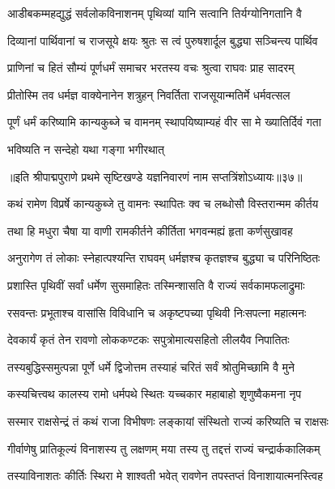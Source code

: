 \twolineshloka
{आडीबकम्महद्युद्धं सर्वलोकविनाशनम्}
{पृथिव्यां यानि सत्वानि तिर्यग्योनिगतानि वै}%

\twolineshloka
{दिव्यानां पार्थिवानां च राजसूये क्षयः श्रुतः}
{स त्वं पुरुषशार्दूल बुद्ध्या सञ्चिन्त्य पार्थिव}%

\twolineshloka
{प्राणिनां च हितं सौम्यं पूर्णधर्मं समाचर}
{भरतस्य वचः श्रुत्वा राघवः प्राह सादरम्}%

\twolineshloka
{प्रीतोस्मि तव धर्मज्ञ वाक्येनानेन शत्रुहन्}
{निवर्तिता राजसूयान्मतिर्मे धर्मवत्सल}%

\twolineshloka
{पूर्णं धर्मं करिष्यामि कान्यकुब्जे च वामनम्}
{स्थापयिष्याम्यहं वीर सा मे ख्यातिर्दिवं गता}%

\onelineshloka
{भविष्यति न सन्देहो यथा गङ्गा भगीरथात्}%

॥इति श्रीपाद्मपुराणे प्रथमे सृष्टिखण्डे यज्ञनिवारणं नाम सप्तत्रिंशोऽध्यायः॥३७॥



\twolineshloka
{कथं रामेण विप्रर्षे कान्यकुब्जे तु वामनः}
{स्थापितः क्व च लब्धोसौ विस्तरान्मम कीर्तय}%

\twolineshloka
{तथा हि मधुरा चैषा या वाणी रामकीर्तने}
{कीर्तिता भगवन्मह्यं हृता कर्णसुखावह}%

\twolineshloka
{अनुरागेण तं लोकाः स्नेहात्पश्यन्ति राघवम्}
{धर्मज्ञश्च कृतज्ञश्च बुद्ध्या च परिनिष्ठितः}%

\twolineshloka
{प्रशास्ति पृथिवीं सर्वां धर्मेण सुसमाहितः}
{तस्मिन्शासति वै राज्यं सर्वकामफलाद्रुमाः}%

\twolineshloka
{रसवन्तः प्रभूताश्च वासांसि विविधानि च}
{अकृष्टपच्या पृथिवी निःसपत्ना महात्मनः}%

\twolineshloka
{देवकार्यं कृतं तेन रावणो लोककण्टकः}
{सपुत्रोमात्यसहितो लीलयैव निपातितः}%

\twolineshloka
{तस्यबुद्धिस्समुत्पन्ना पूर्णे धर्मे द्विजोत्तम}
{तस्याहं चरितं सर्वं श्रोतुमिच्छामि वै मुने}%


\twolineshloka
{कस्यचित्त्वथ कालस्य रामो धर्मपथे स्थितः}
{यच्चकार महाबाहो शृणुष्वैकमना नृप}%

\twolineshloka
{सस्मार राक्षसेन्द्रं तं कथं राजा विभीषणः}
{लङ्कायां संस्थितो राज्यं करिष्यति च राक्षसः}%

\twolineshloka
{गीर्वाणेषु प्रातिकूल्यं विनाशस्य तु लक्षणम्}
{मया तस्य तु तद्दत्तं राज्यं चन्द्रार्ककालिकम्}%

\twolineshloka
{तस्याविनाशतः कीर्तिः स्थिरा मे शाश्वती भवेत्}
{रावणेन तपस्तप्तं विनाशायात्मनस्त्विह}%

